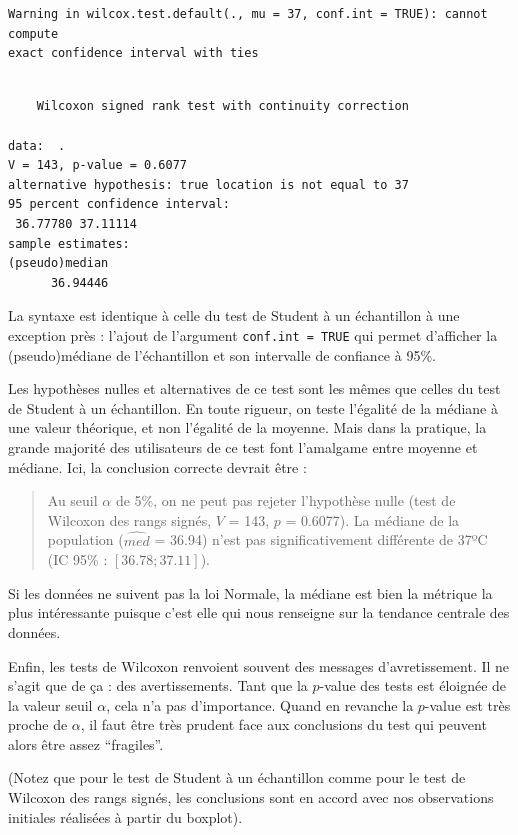 \documentclass[a4paperpaper,]{article}
\begin{document}
\begin{verbatim}
Warning in wilcox.test.default(., mu = 37, conf.int = TRUE): cannot compute
exact confidence interval with ties
\end{verbatim}

\begin{verbatim}

    Wilcoxon signed rank test with continuity correction

data:  .
V = 143, p-value = 0.6077
alternative hypothesis: true location is not equal to 37
95 percent confidence interval:
 36.77780 37.11114
sample estimates:
(pseudo)median 
      36.94446 
\end{verbatim}

La syntaxe est identique à celle du test de Student à un échantillon à une exception près : l'ajout de l'argument \texttt{conf.int\ =\ TRUE} qui permet d'afficher la (pseudo)médiane de l'échantillon et son intervalle de confiance à 95\%.

Les hypothèses nulles et alternatives de ce test sont les mêmes que celles du test de Student à un échantillon. En toute rigueur, on teste l'égalité de la médiane à une valeur théorique, et non l'égalité de la moyenne. Mais dans la pratique, la grande majorité des utilisateurs de ce test font l'amalgame entre moyenne et médiane. Ici, la conclusion correcte devrait être :

\begin{quote}
Au seuil \(\alpha\) de 5\%, on ne peut pas rejeter l'hypothèse nulle (test de Wilcoxon des rangs signés, \(V\) = 143, \(p\) = 0.6077). La médiane de la population (\(\widehat{med}\) = 36.94) n'est pas significativement différente de 37ºC (IC 95\% : \([36.78 ; 37.11]\)).
\end{quote}

Si les données ne suivent pas la loi Normale, la médiane est bien la métrique la plus intéressante puisque c'est elle qui nous renseigne sur la tendance centrale des données.

Enfin, les tests de Wilcoxon renvoient souvent des messages d'avretissement. Il ne s'agit que de ça : des avertissements. Tant que la \(p\)-value des tests est éloignée de la valeur seuil \(\alpha\), cela n'a pas d'importance. Quand en revanche la \(p\)-value est très proche de \(\alpha\), il faut être très prudent face aux conclusions du test qui peuvent alors être assez ``fragiles''.

(Notez que pour le test de Student à un échantillon comme pour le test de Wilcoxon des rangs signés, les conclusions sont en accord avec nos observations initiales réalisées à partir du boxplot).
\end{document}
